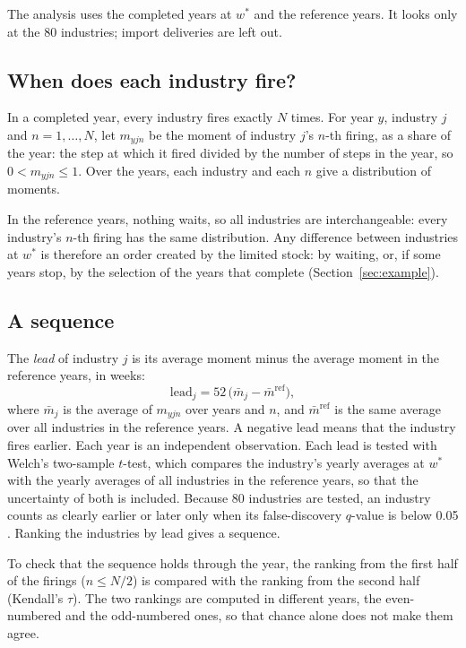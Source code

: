 \documentclass[11pt]{article}
\begin{document}
The analysis uses the completed years at $w^*$ and the reference years. It looks only at the 80 industries; import deliveries are left out.

\subsection{When does each industry fire?}

In a completed year, every industry fires exactly $N$ times. For year $y$, industry $j$ and $n=1,\dots,N$, let $m_{yjn}$ be the moment of industry $j$'s $n$-th firing, as a share of the year: the step at which it fired divided by the number of steps in the year, so $0<m_{yjn}\le1$. Over the years, each industry and each $n$ give a distribution of moments.

In the reference years, nothing waits, so all industries are interchangeable: every industry's $n$-th firing has the same distribution. Any difference between industries at $w^*$ is therefore an order created by the limited stock: by waiting, or, if some years stop, by the selection of the years that complete (Section~\ref{sec:example}).

\subsection{A sequence}

The \emph{lead} of industry $j$ is its average moment minus the average moment in the reference years, in weeks:
\begin{equation}
\text{lead}_j=52\,\big(\bar m_j-\bar m^{\text{ref}}\big),
\end{equation}
where $\bar m_j$ is the average of $m_{yjn}$ over years and $n$, and $\bar m^{\text{ref}}$ is the same average over all industries in the reference years. A negative lead means that the industry fires earlier. Each year is an independent observation. Each lead is tested with Welch's two-sample $t$-test, which compares the industry's yearly averages at $w^*$ with the yearly averages of all industries in the reference years, so that the uncertainty of both is included. Because 80 industries are tested, an industry counts as clearly earlier or later only when its false-discovery $q$-value is below 0.05 \citep{BenjaminiHochberg1995}. Ranking the industries by lead gives a sequence.

To check that the sequence holds through the year, the ranking from the first half of the firings ($n\le N/2$) is compared with the ranking from the second half (Kendall's $\tau$). The two rankings are computed in different years, the even-numbered and the odd-numbered ones, so that chance alone does not make them agree.
\end{document}
